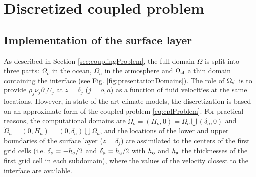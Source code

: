\section{Discretized coupled problem}\label{sec:discreteProblem}
\subsection{Implementation of the surface layer}
As described in Section \ref{sec:couplingProblem}, the full domain 
$\Omega$ is split into three parts: $\Omega_o$ in the ocean, 
$\Omega_a$ in the atmosphere and $\Omega_{\rm sl}$ a thin domain 
containing the interface (see Fig. \ref{fig:presentationDomains}).
The role of  
$\Omega_{\rm sl}$ is to provide $\rho_j \nu_j \partial_z U_j$ 
at $z=\delta_j$ ($j=o,a$) as a function of fluid velocities at the 
same locations. However, in state-of-the-art climate models, the discretization 
is based on an approximate form of the coupled 
problem \eqref{eq:cplProblem}. For practical reasons, the computational
domains are $\widetilde{\Omega}_o = (H_o,0)=\Omega_o \bigcup (\delta_o, 0)$ and 
$\widetilde{\Omega}_a = (0,H_a) = (0,\delta_a ) \bigcup \Omega_a$, and the locations 
of the lower and upper boundaries of the surface layer ($z=\delta_j$)   
are assimilated to the centers of the first grid cells (i.e. $\delta_o=-h_{\rm o}/2$ 
and $\delta_a=h_{\rm a}/2$ with $h_{\rm o}$ and $h_{\rm a}$ the thicknesses of the first grid cell in each 
subdomain), where the  values of the velocity closest to the interface are available. 
%
%
%
